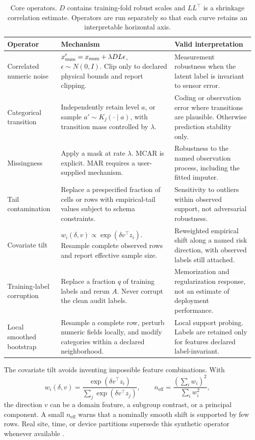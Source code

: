 \documentclass[10pt,twocolumn]{article}
\begin{document}
\begin{table}[t]
\centering
\small
\caption{Core operators. \(D\) contains training-fold robust scales and \(LL^\top\) is a shrinkage correlation estimate. Operators are run separately so that each curve retains an interpretable horizontal axis.}
\label{tab:operators}
\begin{tabular}{p{}p{}p{}}
\toprule
Operator & Mechanism & Valid interpretation \\
\midrule
Correlated numeric noise & \(x'_{\rm num}=x_{\rm num}+\lambda DL\epsilon\), \(\epsilon\sim N(0,I)\). Clip only to declared physical bounds and report clipping. & Measurement robustness when the latent label is invariant to sensor error. \\
Categorical transition & Independently retain level \(a\), or sample \(a'\sim K_j(\cdot\mid a)\), with transition mass controlled by \(\lambda\). & Coding or observation error where transitions are plausible. Otherwise prediction stability only. \\
Missingness & Apply a mask at rate \(\lambda\). MCAR is explicit. MAR requires a user-supplied mechanism. & Robustness to the named observation process, including the fitted imputer. \\
Tail contamination & Replace a prespecified fraction of cells or rows with empirical-tail values subject to schema constraints. & Sensitivity to outliers within observed support, not adversarial robustness. \\
Covariate tilt & \(w_i(\delta,v)\propto\exp(\delta v^\top z_i)\). Resample complete observed rows and report effective sample size. & Reweighted empirical shift along a named risk direction, with observed labels still attached. \\
Training-label corruption & Replace a fraction \(q\) of training labels and rerun \(A\). Never corrupt the clean audit labels. & Memorization and regularization response, not an estimate of deployment performance. \\
Local smoothed bootstrap & Resample a complete row, perturb numeric fields locally, and modify categories within a declared neighborhood. & Local support probing. Labels are retained only for features declared label-invariant. \\
\bottomrule
\end{tabular}
\end{table}

The covariate tilt avoids inventing impossible feature combinations. With
\[
  w_i(\delta,v)=
  \frac{\exp(\delta v^\top z_i)}
       {\sum_j\exp(\delta v^\top z_j)},
  \qquad
  n_{\mathrm{eff}}=\frac{(\sum_i w_i)^2}{\sum_i w_i^2},
\]
the direction \(v\) can be a domain feature, a subgroup contrast, or a principal component. A small \(n_{\mathrm{eff}}\) warns that a nominally smooth shift is supported by few rows. Real site, time, or device partitions supersede this synthetic operator whenever available \citep{koh2021wilds}.
\end{document}
